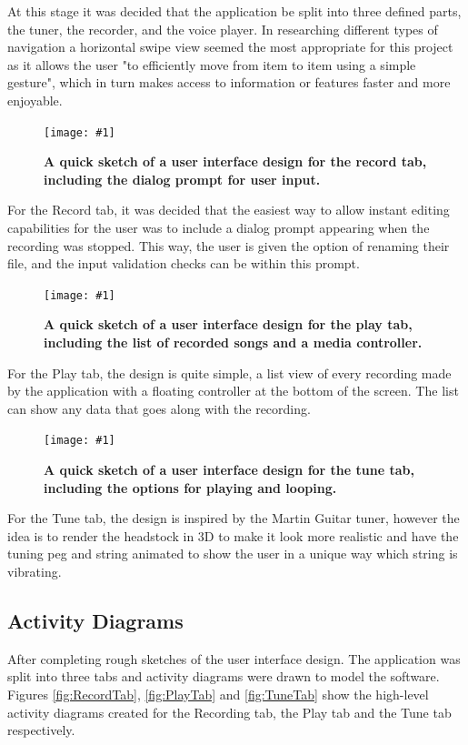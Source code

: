 \documentclass[conference]{acmsiggraph}
\newcommand{\figuremacroF}[3]{
	\begin{figure}[H] %
		\centering
		\texttt{[image: \#1]}
		\caption[#2]{\textbf{#2}}
		\label{fig:#1}
	\end{figure}
}
\begin{document}
At this stage it was decided that the application be split into three defined parts, the tuner, the recorder, and the voice player. In researching different types of navigation a horizontal swipe view seemed the most appropriate for this project as it allows the user "to efficiently move from item to item using a simple gesture", which in turn makes access to information or features faster and more enjoyable. \cite{swipeArticle}

\figuremacroF
{recordSketch}
{A quick sketch of a user interface design for the record tab, including the dialog prompt for user input.}
{1.0}

For the Record tab, it was decided that the easiest way to allow instant editing capabilities for the user was to include a dialog prompt appearing when the recording was stopped. This way, the user is given the option of renaming their file, and the input validation checks can be within this prompt. 

\figuremacroF
{playSketch}
{A quick sketch of a user interface design for the play tab, including the list of recorded songs and a media controller.}
{1.0}

For the Play tab, the design is quite simple, a list view of every recording made by the application with a floating controller at the bottom of the screen. The list can show any data that goes along with the recording.

\figuremacroF
{tuneSketch}
{A quick sketch of a user interface design for the tune tab, including the options for playing and looping.}
{1.0}

For the Tune tab, the design is inspired by the Martin Guitar tuner, however the idea is to render the headstock in 3D to make it look more realistic and have the tuning peg and string animated to show the user in a unique way which string is vibrating.

\clearpage

\subsection{Activity Diagrams}

After completing rough sketches of the user interface design. The application was split into three tabs and activity diagrams were drawn to model the software. Figures \ref{fig:RecordTab}, \ref{fig:PlayTab} and \ref{fig:TuneTab} show the high-level activity diagrams created for the Recording tab, the Play tab and the Tune tab respectively.
\end{document}

